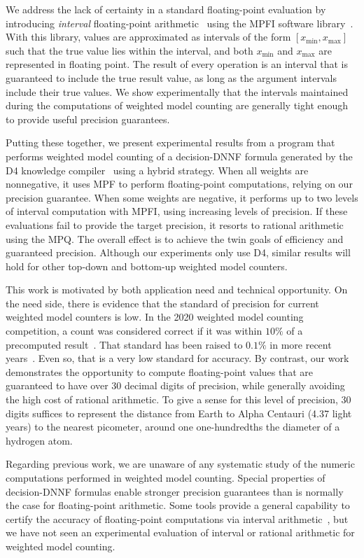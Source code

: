 \documentclass[letterpaper,USenglish,cleveref, autoref, thm-restate]{lipics-v2021}
\newcommand{\xmin}{x_{\textrm{min}}}
\newcommand{\xmax}{x_{\textrm{max}}}
\begin{document}
We address the lack of certainty in a standard floating-point
evaluation by introducing \emph{interval} floating-point
arithmetic~\cite{hickey:jacm:2001} using the MPFI software
library~\cite{revol:rc:2005}. With this library, values are
approximated as intervals of the form $[\xmin, \xmax]$ such that the
true value lies within the interval, and both $\xmin$ and $\xmax$ are
represented in floating point.  The result of every operation is an
interval that is guaranteed to include the true result value, as long
as the argument intervals include their true values.  We show
experimentally that the intervals maintained during the computations
of weighted model counting are generally tight enough to provide
useful precision guarantees.

Putting these together, we present experimental results from a program
that performs weighted model counting of a decision-DNNF formula
generated by the D4 knowledge compiler~\cite{lagniez:ijcai:2017} using
a hybrid strategy.  When all weights are nonnegative, it uses MPF to
perform floating-point computations, relying on our precision
guarantee.  When some weights are negative, it performs up to two
levels of interval computation with MPFI, using increasing levels of
precision.  If these evaluations fail to provide the target precision,
it resorts to rational arithmetic using the MPQ\@.  The overall effect
is to achieve the twin goals of efficiency and guaranteed precision.
Although our experiments only use D4, similar results will hold for other top-down and bottom-up weighted model counters.

This work is motivated by both application need and technical
opportunity.  On the need side, there is evidence that the standard of
precision for current weighted model counters is low.  In the 2020
weighted model counting competition, a count was considered correct if
it was within $10\%$ of a precomputed result~\cite{fichte:jea:2020}.
That standard has been raised to $0.1\%$ in more recent
years~\cite{hecher:mc:2024}.  Even so, that is a very low standard for
accuracy.  By contrast, our work demonstrates the opportunity to
compute floating-point values that are guaranteed to have over 30 decimal
digits of precision, while generally avoiding the high cost of
rational arithmetic.  To give a sense for this level of precision,
30 digits suffices to represent the distance from
Earth to Alpha Centauri (4.37 light years) to the nearest picometer,
around one one-hundredths the diameter of a hydrogen atom.

Regarding previous work, we are unaware of any 
systematic study of the numeric computations
performed in weighted model counting.  Special properties of
decision-DNNF formulas enable stronger precision guarantees than is
normally the case for floating-point arithmetic.  Some tools provide a
general capability to certify the accuracy of floating-point computations
via interval arithmetic~\cite{becker:fmcad:2016}, but we have not seen an experimental
evaluation of interval or rational arithmetic for
weighted model counting.
\end{document}
